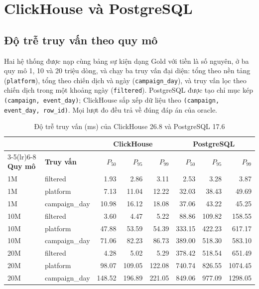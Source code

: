 \section{ClickHouse và PostgreSQL}
\label{sec:c5-clickhouse-vs-postgres}

\subsection{Độ trễ truy vấn theo quy mô}
\label{sec:c5-do-tre-truy-van}
Hai hệ thống được nạp cùng bảng sự kiện dạng Gold với tiền là số nguyên, ở ba quy mô 1, 10 và 20 triệu dòng, và chạy ba truy vấn đại diện: tổng theo nền tảng (\texttt{platform}), tổng theo chiến dịch và ngày (\texttt{campaign\_day}), và truy vấn lọc theo chiến dịch trong một khoảng ngày (\texttt{filtered}). PostgreSQL được tạo chỉ mục kép \texttt{(campaign, event\_day)}; ClickHouse sắp xếp dữ liệu theo \texttt{(campaign, event\_day, row\_id)}. Mọi lượt đo đều trả về đúng đáp án của oracle.

\begin{table}[H]
\centering
\caption{Độ trễ truy vấn (ms) của ClickHouse 26.8 và PostgreSQL 17.6}
\label{tab:ch-pg}
\small
\renewcommand{\arraystretch}{1.15}
\begin{tabular}{llrrrrrr}
\toprule
 & & \multicolumn{3}{c}{\textbf{ClickHouse}} & \multicolumn{3}{c}{\textbf{PostgreSQL}} \\
\cmidrule(lr){3-5}\cmidrule(lr){6-8}
\textbf{Quy mô} & \textbf{Truy vấn} & $P_{50}$ & $P_{95}$ & $P_{99}$ & $P_{50}$ & $P_{95}$ & $P_{99}$ \\
\midrule
1M & filtered & \num{1.93} & \num{2.86} & \num{3.11} & \num{2.53} & \num{3.28} & \num{3.87} \\
1M & platform & \num{7.13} & \num{11.04} & \num{12.22} & \num{32.03} & \num{38.43} & \num{49.69} \\
1M & campaign\_day & \num{10.98} & \num{16.12} & \num{18.08} & \num{37.06} & \num{43.22} & \num{45.25} \\
\midrule
10M & filtered & \num{3.60} & \num{4.47} & \num{5.22} & \num{88.86} & \num{109.82} & \num{158.55} \\
10M & platform & \num{47.88} & \num{53.59} & \num{54.39} & \num{333.15} & \num{422.23} & \num{617.17} \\
10M & campaign\_day & \num{71.06} & \num{82.23} & \num{86.73} & \num{389.00} & \num{518.30} & \num{583.10} \\
\midrule
20M & filtered & \num{4.28} & \num{5.02} & \num{5.29} & \num{378.42} & \num{518.54} & \num{651.49} \\
20M & platform & \num{98.07} & \num{109.05} & \num{122.08} & \num{740.74} & \num{826.55} & \num{1074.45} \\
20M & campaign\_day & \num{148.52} & \num{196.89} & \num{221.05} & \num{849.06} & \num{977.09} & \num{1298.05} \\
\bottomrule
\end{tabular}
\end{table}

